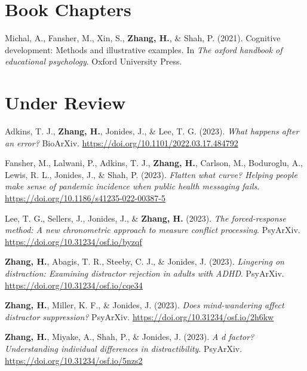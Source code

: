 \documentclass[11pt,a4paper,]{awesome-cv}
\begin{document}
\hypertarget{book-chapters}{%
\section{Book Chapters}\label{book-chapters}}

\hypertarget{bibliography}{}
\leavevmode{}%
Michal, A., Fansher, M., Xin, S., \textbf{Zhang, H.}, \& Shah, P.
(2021). Cognitive development: Methods and illustrative examples. In
\emph{The oxford handbook of educational psychology}. Oxford University
Press.

\hypertarget{under-review}{%
\section{Under Review}\label{under-review}}

\hypertarget{bibliography}{}
\leavevmode{}%
Adkins, T. J., \textbf{Zhang, H.}, Jonides, J., \& Lee, T. G. (2023).
\emph{What happens after an error?} BioArXiv.
\url{https://doi.org/10.1101/2022.03.17.484792}

\leavevmode{}%
Fansher, M., Lalwani, P., Adkins, T. J., \textbf{Zhang, H.}, Carlson,
M., Boduroglu, A., Lewis, R. L., Jonides, J., \& Shah, P. (2023).
\emph{Flatten what curve? Helping people make sense of pandemic
incidence when public health messaging fails}.
\url{https://doi.org/10.1186/s41235-022-00387-5}

\leavevmode{}%
Lee, T. G., Sellers, J., Jonides, J., \& \textbf{Zhang, H.} (2023).
\emph{The forced-response method: A new chronometric approach to measure
conflict processing}. PsyArXiv.
\url{https://doi.org/10.31234/osf.io/byzqf}

\leavevmode{}%
\textbf{Zhang, H.}, Abagis, T. R., Steeby, C. J., \& Jonides, J. (2023).
\emph{Lingering on distraction: Examining distractor rejection in adults
with ADHD}. PsyArXiv. \url{https://doi.org/10.31234/osf.io/cqe34}

\leavevmode{}%
\textbf{Zhang, H.}, Miller, K. F., \& Jonides, J. (2023). \emph{Does
mind-wandering affect distractor suppression?} PsyArXiv.
\url{https://doi.org/10.31234/osf.io/2h6kw}

\leavevmode{}%
\textbf{Zhang, H.}, Miyake, A., Shah, P., \& Jonides, J. (2023). \emph{A
d factor? Understanding individual differences in distractibility}.
PsyArXiv. \url{https://doi.org/10.31234/osf.io/5nzs2}
\end{document}
